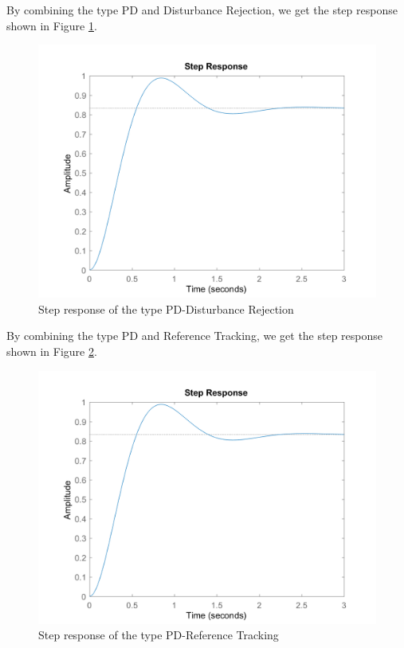 \documentclass[a4paper, twocolumn, titlepage, 10pt]{article}
\begin{document}
		By combining the type PD and Disturbance Rejection, we get the step response shown in Figure \ref{PD-rej-step}.
		\begin{figure}[H]
			\centering
			\includegraphics[width=\linewidth]{PD-rej-step}
			\caption{Step response of the type PD-Disturbance Rejection}
			\label{PD-rej-step}
		\end{figure}	
		By combining the type PD and Reference Tracking, we get the step response shown in Figure \ref{PD-track-step}.
		\begin{figure}[H]
			\centering
			\includegraphics[width=\linewidth]{PD-track-step}
			\caption{Step response of the type PD-Reference Tracking}
			\label{PD-track-step}
		\end{figure}
\end{document}
